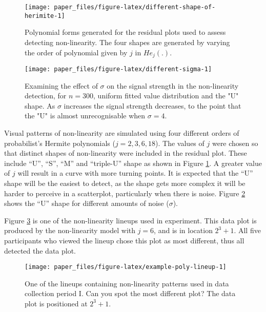 \documentclass[]{interact}
\theoremstyle{plain}%
\theoremstyle{definition}
\theoremstyle{remark}
\begin{document}
\begin{figure}[!h]

{\centering \texttt{[image: paper\_files/figure-latex/different-shape-of-herimite-1]} 

}

\caption{Polynomial forms generated for the residual plots used to assess detecting non-linearity. The four shapes are generated by varying the order of polynomial given by $j$ in $He_j(.)$.}\label{fig:different-shape-of-herimite}
\end{figure}

\begin{figure}[!h]

{\centering \texttt{[image: paper\_files/figure-latex/different-sigma-1]} 

}

\caption{Examining the effect of $\sigma$ on the signal strength in the non-linearity detection, for $n=300$, uniform fitted value distribution and the "U" shape. As $\sigma$ increases the signal strength decreases, to the point that the "U" is almost unrecognisable when $\sigma=4$.}\label{fig:different-sigma}
\end{figure}

Visual patterns of non-linearity are simulated using four different
orders of probabilist's Hermite polynomials (\(j = 2, 3, 6, 18\)). The
values of \(j\) were chosen so that distinct shapes of non-linearity
were included in the residual plot. These include ``U'', ``S'', ``M''
and ``triple-U'' shape as shown in Figure
\ref{fig:different-shape-of-herimite}. A greater value of \(j\) will
result in a curve with more turning points. It is expected that the
``U'' shape will be the easiest to detect, as the shape gets more
complex it will be harder to perceive in a scatterplot, particularly
when there is noise. Figure \ref{fig:different-sigma} shows the ``U''
shape for different amounts of noise (\(\sigma\)).

Figure \ref{fig:example-poly-lineup} is one of the non-linearity lineups
used in experiment. This data plot is produced by the non-linearity
model with \(j = 6\), and is in location \(2^3+1\). All five
participants who viewed the lineup chose this plot as most different,
thus all detected the data plot.

\begin{figure}[t!]

{\centering \texttt{[image: paper\_files/figure-latex/example-poly-lineup-1]} 

}

\caption{One of the lineups containing non-linearity patterns used in data collection period I. Can you spot the most different plot? The data plot is positioned at $2^3 + 1$.}\label{fig:example-poly-lineup}
\end{figure}
\end{document}
